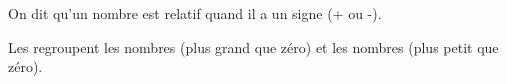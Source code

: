 On dit qu'un nombre est relatif quand il a un signe (+ ou -).\par\noindent
Les  regroupent les nombres 
(plus grand que zéro) et les nombres  (plus petit que zéro).